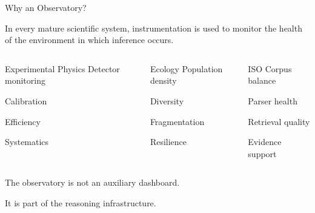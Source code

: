 \documentclass[aspectratio=169]{beamer}
\begin{document}

\begin{frame}{Why an Observatory?}

In every mature scientific system, instrumentation is used to monitor
the health of the environment in which inference occurs.

\vspace{0.45cm}

\begin{columns}[T]


\begin{block}{Experimental Physics}
\centering
Detector monitoring

Calibration

Efficiency

Systematics
\end{block}


\begin{block}{Ecology}
\centering
Population density

Diversity

Fragmentation

Resilience
\end{block}


\begin{block}{ISO}
\centering
Corpus balance

Parser health

Retrieval quality

Evidence support
\end{block}

\end{columns}

\vspace{0.55cm}

\begin{center}
\Large
The observatory is not an auxiliary dashboard.

It is part of the reasoning infrastructure.
\end{center}

\end{frame}

\end{document}
